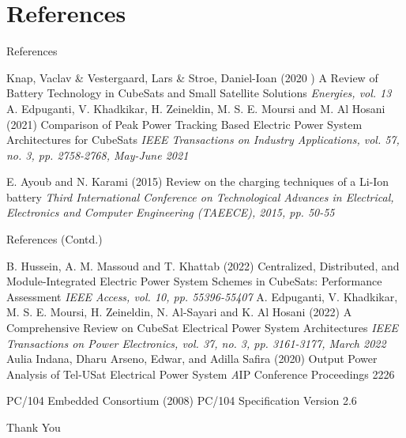 \documentclass[aspectratio=169]{beamer}
\begin{document}
		\section{References}
		\begin{frame}{References}
			
			\begin{thebibliography}{9}
				
				Knap, Vaclav \& Vestergaard, Lars \& Stroe, Daniel-Ioan (2020	)
				\newblock A Review of Battery Technology in CubeSats
				and Small Satellite Solutions
				\newblock \emph{Energies, vol. 13}	
				A. Edpuganti, V. Khadkikar, H. Zeineldin, M. S. E. Moursi and M. Al Hosani (2021)
				\newblock Comparison of Peak Power Tracking Based Electric Power System Architectures for CubeSats
				\newblock \emph{IEEE Transactions on Industry Applications, vol. 57, no. 3, pp. 2758-2768, May-June 2021}
				
				E. Ayoub and N. Karami (2015)
				\newblock Review on the charging techniques of a Li-Ion battery
				\newblock \emph{Third International Conference on Technological Advances in Electrical, Electronics and Computer Engineering (TAEECE), 2015, pp. 50-55}
			\end{thebibliography}
		\end{frame}
		\begin{frame}{References (Contd.)}
			
			\begin{thebibliography}{9}
				
				\bibitem[4]{p1}
				B. Hussein, A. M. Massoud and T. Khattab (2022)
				\newblock Centralized, Distributed, and Module-Integrated Electric Power System Schemes in CubeSats: Performance Assessment
				\newblock \emph{ IEEE Access, vol. 10, pp. 55396-55407}
				A. Edpuganti, V. Khadkikar, M. S. E. Moursi, H. Zeineldin, N. Al-Sayari and K. Al Hosani (2022)
				\newblock A Comprehensive Review on CubeSat Electrical Power System Architectures
				\newblock \emph { IEEE Transactions on Power Electronics, vol. 37, no. 3, pp. 3161-3177, March 2022}
				\bibitem[6]{p1}
				Aulia Indana, Dharu Arseno, Edwar, and Adilla Safira (2020)
				\newblock Output Power Analysis of Tel-USat Electrical Power System 
				\newblock \emph  AIP Conference Proceedings 2226
				
				\bibitem[7]{p1}
PC/104 Embedded Consortium (2008)
\newblock PC/104 Specification
Version 2.6
				
				
				
				
				
				
				
				
				
			\end{thebibliography}
		\end{frame}
		
		\begin{frame}
			\huge \center Thank You
			
		\end{frame}
	
\end{document}
